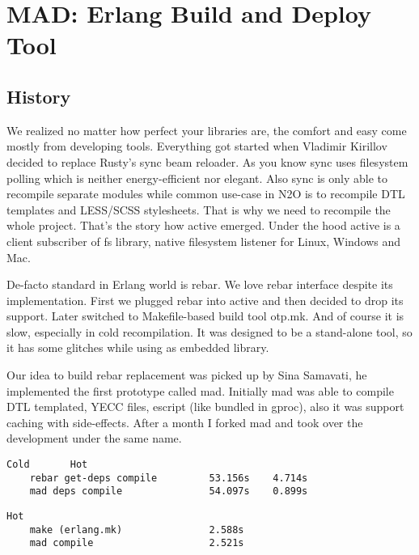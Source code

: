 \section{MAD: Erlang Build and Deploy Tool}

\subsection{History}

We realized no matter how perfect your libraries are,
the comfort and easy come mostly from developing tools.
Everything got started when Vladimir Kirillov decided to
replace Rusty's sync beam reloader. As you know sync uses
filesystem polling which is neither energy-efficient nor elegant. Also
sync is only able to recompile separate modules while
common use-case in N2O is to recompile DTL templates
and LESS/SCSS stylesheets. That is why we need to recompile
the whole project. That's the story how active emerged.
Under the hood active is a client subscriber
of fs library, native filesystem listener for Linux, Windows and Mac.

De-facto standard in Erlang world is rebar.
We love rebar interface despite its implementation.
First we plugged rebar into active and then decided to drop its support.
Later switched to Makefile-based build tool otp.mk.
And of course it is slow, especially in cold recompilation.
It was designed to be a stand-alone tool, so it has some
glitches while using as embedded library.

Our idea to build rebar replacement was picked up by Sina Samavati,
he implemented the first prototype called mad. Initially mad
was able to compile DTL templated, YECC files, escript (like
bundled in gproc), also it was support caching with side-effects.
After a month I forked mad and took over the development under the same name.

\vspace{1\baselineskip}
\begin{lstlisting}[caption=Example of building N2O sample]
                                   Cold       Hot
    rebar get-deps compile         53.156s    4.714s
    mad deps compile               54.097s    0.899s
\end{lstlisting}
\vspace{1\baselineskip}

\vspace{1\baselineskip}
\begin{lstlisting}[caption=Example of building Cowboy]
                                   Hot
    make (erlang.mk)               2.588s
    mad compile                    2.521s
\end{lstlisting}
\vspace{1\baselineskip}

